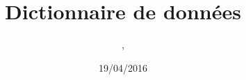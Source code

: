 \documentclass[asi, sansVersion]{picInsa}
\begin{document}
\title{Dictionnaire de données}
\author{\Mathieu, \Julie}
\date{19/04/2016} 

\maketitle

\tableofcontents


\end{document}
